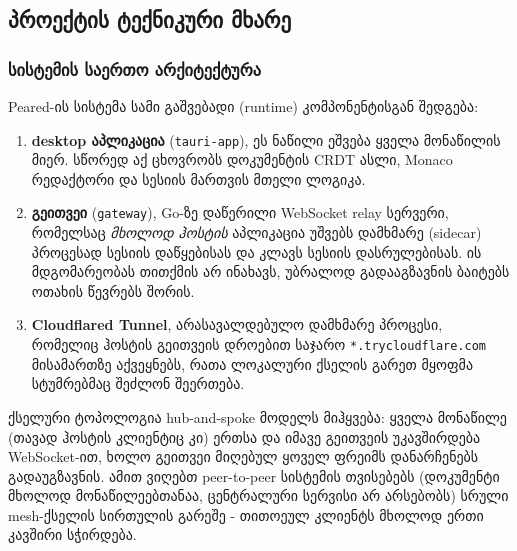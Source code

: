 \subsection{პროექტის ტექნიკური მხარე}

\subsubsection{სისტემის საერთო არქიტექტურა}

Peared-ის სისტემა სამი გაშვებადი (runtime) კომპონენტისგან შედგება:

\begin{enumerate}[itemsep=0pt]
  \item \textbf{desktop აპლიკაცია} (\texttt{tauri-app}), ეს ნაწილი ეშვება
        ყველა მონაწილის მიერ. სწორედ აქ ცხოვრობს დოკუმენტის CRDT ასლი, Monaco
        რედაქტორი და სესიის მართვის მთელი ლოგიკა.
  \item \textbf{გეითვეი} (\texttt{gateway}), Go-ზე დაწერილი WebSocket
        relay სერვერი, რომელსაც \emph{მხოლოდ ჰოსტის} აპლიკაცია უშვებს
        დამხმარე (sidecar) პროცესად სესიის დაწყებისას და კლავს სესიის
        დასრულებისას. ის მდგომარეობას თითქმის არ ინახავს, უბრალოდ
        გადააგზავნის ბაიტებს ოთახის წევრებს შორის.
  \item \textbf{Cloudflared Tunnel}, არასავალდებულო დამხმარე პროცესი,
        რომელიც ჰოსტის გეითვეის დროებით საჯარო
        \texttt{*.trycloudflare.com} მისამართზე აქვეყნებს, რათა ლოკალური
        ქსელის გარეთ მყოფმა სტუმრებმაც შეძლონ შეერთება.
\end{enumerate}

ქსელური ტოპოლოგია hub-and-spoke მოდელს მიჰყვება: ყველა მონაწილე (თავად
ჰოსტის კლიენტიც კი) ერთსა და იმავე გეითვეის უკავშირდება WebSocket-ით, ხოლო
გეითვეი მიღებულ ყოველ ფრეიმს დანარჩენებს გადაუგზავნის. ამით ვიღებთ
peer-to-peer სისტემის თვისებებს (დოკუმენტი მხოლოდ მონაწილეებთანაა,
ცენტრალური სერვისი არ არსებობს) სრული mesh-ქსელის სირთულის გარეშე -
თითოეულ კლიენტს მხოლოდ ერთი კავშირი სჭირდება.

